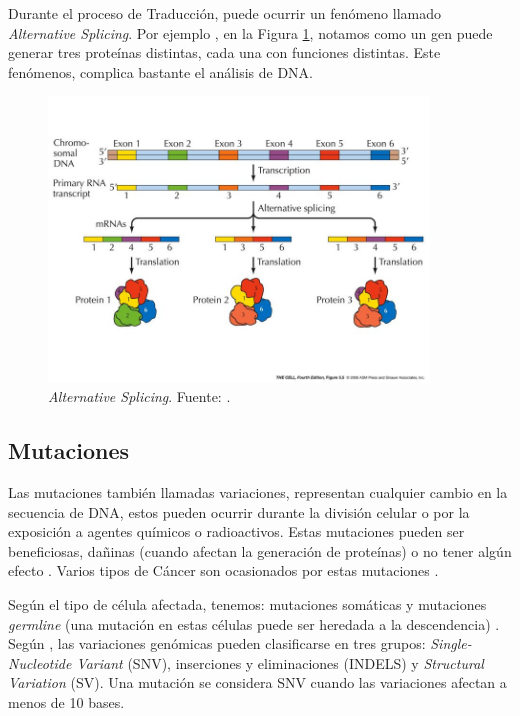 Durante el proceso de Traducción, puede ocurrir un fenómeno llamado \textit{Alternative Splicing}. Por ejemplo , en la Figura \ref{img:alt}, notamos como un gen puede generar tres proteínas distintas, cada una con funciones distintas. Este fenómenos, complica bastante el análisis de DNA.


\begin{figure}[]
	\centering
	\includegraphics[width=0.9\textwidth]{../img/neoantigen/alt}
	\caption{\textit{Alternative Splicing}. Fuente:  \cite{nci2020}.}	
	\label{img:alt}
\end{figure}


\subsection{Mutaciones}

Las mutaciones también llamadas variaciones, representan cualquier cambio en la secuencia de DNA, estos pueden ocurrir durante la división celular o por la exposición a agentes químicos o radioactivos. Estas mutaciones pueden ser beneficiosas, dañinas (cuando afectan la generación de proteínas) o no tener algún efecto  \citep{NCIdictionary2022}. Varios tipos de Cáncer son ocasionados por estas mutaciones \citep{borden2022cancer, chen2021challenges, de2020neoantigen}. 

Según el tipo de célula afectada, tenemos: mutaciones somáticas y mutaciones \textit{germline} (una mutación en estas células puede ser heredada a la descendencia) \citep{clancy2008genetic}.  Según \citep{xu2018review}, las variaciones genómicas pueden clasificarse en tres grupos: \textit{Single-Nucleotide Variant} (SNV), inserciones y eliminaciones (INDELS) y \textit{Structural Variation} (SV). Una mutación se considera SNV cuando las variaciones afectan a menos de 10 bases. 

